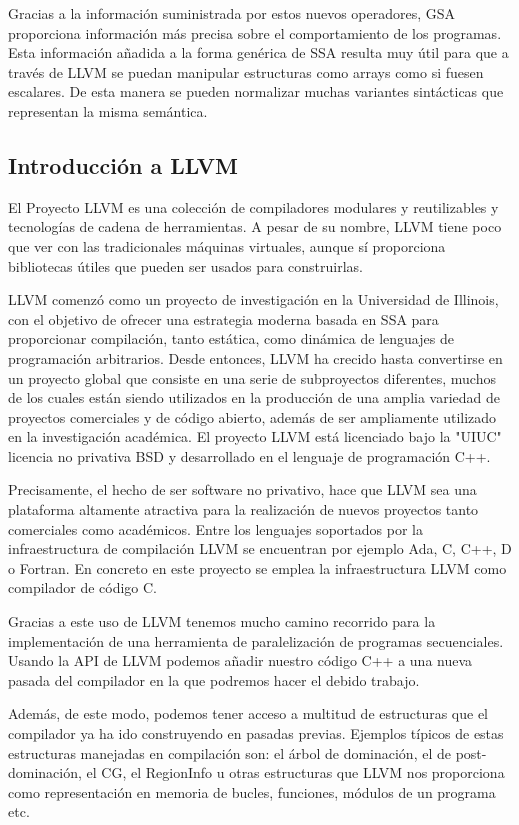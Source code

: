 Gracias a la información suministrada por estos nuevos operadores, GSA proporciona información más precisa sobre el comportamiento de los programas. Esta información añadida a la forma genérica de SSA resulta muy útil para que a través de LLVM se puedan manipular estructuras como arrays como si fuesen escalares. De esta manera se pueden normalizar muchas variantes sintácticas que representan la misma semántica.

%
\subsection{Introducción a LLVM}
El Proyecto LLVM es una colección de compiladores modulares y reutilizables y tecnologías de cadena de herramientas. A pesar de su nombre, LLVM tiene poco que ver con las tradicionales máquinas virtuales, aunque sí proporciona bibliotecas útiles que pueden ser usados para construirlas.

LLVM comenzó como un proyecto de investigación en la Universidad de Illinois, con el objetivo de ofrecer una estrategia moderna basada en SSA para proporcionar compilación, tanto estática, como dinámica de lenguajes de programación arbitrarios. Desde entonces, LLVM ha crecido hasta convertirse en un proyecto global que consiste en una serie de subproyectos diferentes, muchos de los cuales están siendo utilizados en la producción de una amplia variedad de proyectos comerciales y de código abierto, además de ser ampliamente utilizado en la investigación académica. El proyecto LLVM está licenciado bajo la "UIUC" licencia no privativa BSD y desarrollado en el lenguaje de programación C++.

Precisamente, el hecho de ser software no privativo, hace que LLVM sea una plataforma altamente atractiva para la realización de nuevos proyectos tanto comerciales como académicos.
Entre los lenguajes soportados por la infraestructura de compilación LLVM se encuentran por ejemplo  Ada, C, C++, D o Fortran. En concreto en este proyecto se emplea la infraestructura LLVM como compilador de código C. 

Gracias a este uso de LLVM tenemos mucho camino recorrido para la implementación de una herramienta de paralelización de programas secuenciales. Usando la API de LLVM podemos añadir nuestro código C++ a una nueva pasada del compilador en la que podremos hacer el debido trabajo. 

Además, de este modo, podemos tener acceso a multitud de estructuras que el compilador ya ha ido construyendo en pasadas previas. Ejemplos típicos de estas estructuras manejadas en compilación son: el árbol de dominación, el de post-dominación, el CG, el RegionInfo u otras estructuras que LLVM nos proporciona como representación en memoria de bucles, funciones, módulos de un programa etc.

